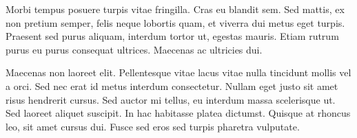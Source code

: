 \documentclass{book}
\begin{document}
\begin{flushleft}
Morbi tempus posuere turpis vitae fringilla. Cras eu blandit sem. Sed mattis, ex non pretium semper, felis neque lobortis quam, et viverra dui metus eget turpis. Praesent sed purus aliquam, interdum tortor ut, egestas mauris. Etiam rutrum purus eu purus consequat ultrices. Maecenas ac ultricies dui.
\end{flushleft}

\begin{flushright}
Maecenas non laoreet elit. Pellentesque vitae lacus vitae nulla tincidunt mollis vel a orci. Sed nec erat id metus interdum consectetur. Nullam eget justo sit amet risus hendrerit cursus. Sed auctor mi tellus, eu interdum massa scelerisque ut. Sed laoreet aliquet suscipit. In hac habitasse platea dictumst. Quisque at rhoncus leo, sit amet cursus dui. Fusce sed eros sed turpis pharetra vulputate.
\end{flushright}
\end{document}
